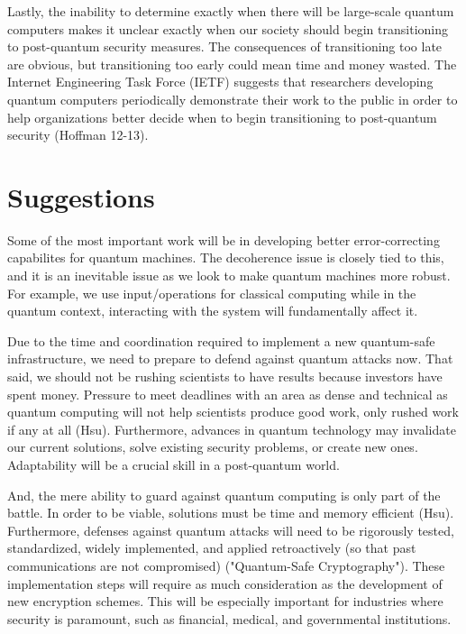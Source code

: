 \documentclass[11pt]{article}
\begin{document}
Lastly, the inability to determine exactly when there will be large-scale quantum computers makes it unclear exactly when our society should begin transitioning to post-quantum security measures. The consequences of transitioning too late are obvious, but transitioning too early could mean time and money wasted. The Internet Engineering Task Force (IETF) suggests that researchers developing quantum computers periodically demonstrate their work to the public in order to help organizations better decide when to begin transitioning to post-quantum security (Hoffman 12-13).


\section{Suggestions}


Some of the most important work will be in developing better error-correcting
capabilites for quantum machines. The decoherence issue is closely tied to this, and it
is an inevitable issue as we look to make quantum machines more robust.
For example, we use input/operations for classical computing while in the quantum context,
interacting with the system will fundamentally affect it.


Due to the time and coordination required to implement a new quantum-safe infrastructure, we need to prepare to defend against quantum attacks now. That said, we should not be rushing scientists to have results because investors have spent money. Pressure to meet deadlines with an area as dense and technical as quantum computing will not help scientists produce good work, only rushed work if any at all (Hsu). Furthermore, advances in quantum technology may invalidate our current solutions, solve existing security problems, or create new ones. Adaptability will be a crucial skill in a post-quantum world. 

And, the mere ability to guard against quantum computing is only part of the battle. In order to be viable, solutions must be time and memory efficient (Hsu).
Furthermore, defenses against quantum attacks will need to be rigorously tested, standardized, widely implemented, and applied retroactively
(so that past communications are not compromised) ("Quantum-Safe Cryptography").
These implementation steps will require as much consideration as the development of new encryption schemes. This will be especially important for industries where security is paramount, such as financial, medical, and governmental institutions.
\end{document}
